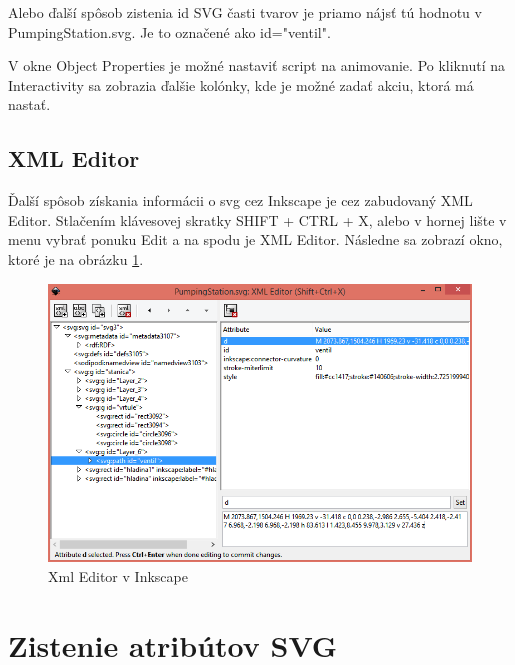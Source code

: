 Alebo ďalší spôsob zistenia id SVG časti tvarov je priamo nájsť tú hodnotu v PumpingStation.svg. Je to označené ako id="ventil".

V okne Object Properties je možné nastaviť script na animovanie. Po kliknutí na Interactivity sa zobrazia ďalšie kolónky, kde je možné zadať akciu, ktorá má nastať.  



\subsection{XML Editor}
Ďalší spôsob získania informácii o svg cez Inkscape je cez zabudovaný XML Editor.
Stlačením klávesovej skratky SHIFT + CTRL + X, alebo v hornej lište v menu vybrať ponuku Edit a na spodu je XML Editor. Následne sa zobrazí okno, ktoré je na obrázku \ref{xmlEditor}.
\begin{figure}[!hp]
	\begin{center}
		\includegraphics[width=0.7\linewidth]  {obrazky/XmlEditor2.png}
		\caption{Xml Editor v Inkscape}
		\label{xmlEditor}
	\end{center}
\end{figure}


\section{Zistenie atribútov SVG}

